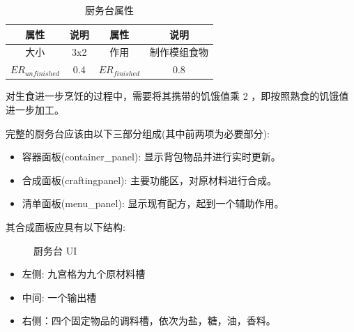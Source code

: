 \begin{table}[H]
    \centering
    \caption{厨务台属性}
    \setlength{\tabcolsep}{4mm}
    \begin{tabular}{c|cc|c}
        \toprule
        \textbf{属性} & \textbf{说明} & \textbf{属性} & \textbf{说明} \\
        \midrule
        大小 & 3x2 & 作用 & 制作模组食物 \\
        $ER_{unfinished}$ & 0.4 & $ER_{finished}$ & 0.8 \\
        \bottomrule
    \end{tabular}
\end{table}

对生食进一步烹饪的过程中，需要将其携带的饥饿值乘 2 ，即按照熟食的饥饿值进一步加工。

完整的厨务台应该由以下三部分组成(其中前两项为必要部分):
\begin{itemize}
    \item 容器面板(container\_panel): 显示背包物品并进行实时更新。
    \item 合成面板(crafting\-panel): 主要功能区，对原材料进行合成。
    \item 清单面板(menu\_panel): 显示现有配方，起到一个辅助作用。
\end{itemize}

其合成面板应具有以下结构:

\begin{figure}[H]
    \centering
    \caption{厨务台 UI}
\end{figure}

\begin{itemize}
    \item 左侧: 九宫格为九个原材料槽
    \item 中间: 一个输出槽
    \item 右侧：四个固定物品的调料槽，依次为盐，糖，油，香料。
\end{itemize}

